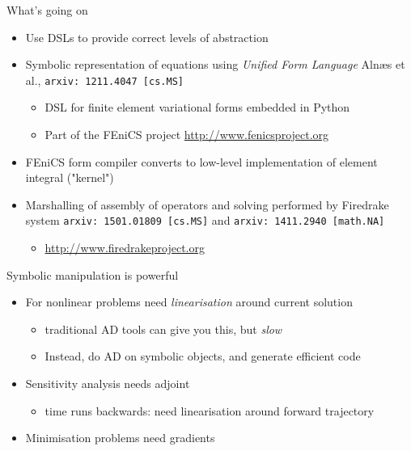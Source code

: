 \documentclass[presentation]{beamer}
\begin{document}
\begin{frame}[fragile,label=sec-3-2]{What's going on}
 \begin{itemize}
\item Use DSLs to provide correct levels of abstraction

\item Symbolic representation of equations using \emph{Unified Form Language}
  Alnæs et al., \verb~arxiv: 1211.4047 [cs.MS]~
\begin{itemize}
\item DSL for finite element variational forms embedded in Python
\item Part of the FEniCS project \url{http://www.fenicsproject.org}
\end{itemize}

\item FEniCS form compiler converts to low-level implementation of element
integral ("kernel")

\item Marshalling of assembly of operators and solving performed by
Firedrake system \verb~arxiv: 1501.01809 [cs.MS]~ and \verb~arxiv: 1411.2940 [math.NA]~
\begin{itemize}
\item \url{http://www.firedrakeproject.org}
\end{itemize}
\end{itemize}
\end{frame}

\begin{frame}[label=sec-3-3]{Symbolic manipulation is powerful}
\begin{itemize}
\item For nonlinear problems need \emph{linearisation} around current solution
\begin{itemize}
\item traditional AD tools can give you this, but \emph{slow}
\item Instead, do AD on symbolic objects, and generate efficient code
\end{itemize}
\item Sensitivity analysis needs adjoint
\begin{itemize}
\item time runs backwards: need linearisation around forward trajectory
\end{itemize}
\item Minimisation problems need gradients
\end{itemize}
\end{frame}
\end{document}
